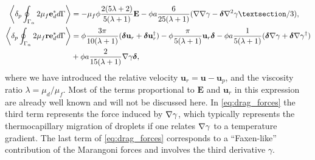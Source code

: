 \begin{align}
    \pSavg{ 2\mu_f \textbf{e}_d^*}
    &=
    -  \mu_f \phi \frac{2(5\lambda +2)}{5(\lambda+1)}\textbf{E}
    - \phi a  \frac{6}{25(\lambda+1)} (\grad\grad \gamma- \bm\delta\grad^2 \gamma§/3),\\
    \pSavg{ 2 \mu_f \textbf{re}_d^* }
    &=
    \phi \frac{3\pi}{10(\lambda+1)}
    (\bm\delta \textbf{u}_r +  \bm\delta\textbf{u}_r^\dagger)
    -\phi \frac{\pi}{5(\lambda+1)}\textbf{u}_r\bm\delta 
    -\phi a\frac{1}{5(\lambda+1)} (\bm\delta \grad \gamma+ \bm\delta\grad\gamma^\dagger)
    \nonumber \\&
    + \phi a\frac{2}{15(\lambda+1)}\grad\gamma\bm\delta,
    \label{eq:secondUN}
\end{align}
where we have introduced the relative velocity $\textbf{u}_r = \textbf{u} - \textbf{u}_p$, and the viscosity ratio $\lambda = \mu_d/\mu_f$. 
Most of the terms proportional to $\textbf{E}$ and $\textbf{u}_r$ in this expression are already well known and will not be discussed here.  
In \ref{eq:drag_forces} the third term represents the force induced by $\mathbf{\nabla} \gamma$, which typically represents the thermocapillary migration of droplets if one relates $\mathbf{\nabla}\gamma$ to a temperature gradient.  
The last term of \ref{eq:drag_forces} corresponds to a ``Faxen-like'' contribution of the Marangoni forces and involves the third derivative $\gamma$.
